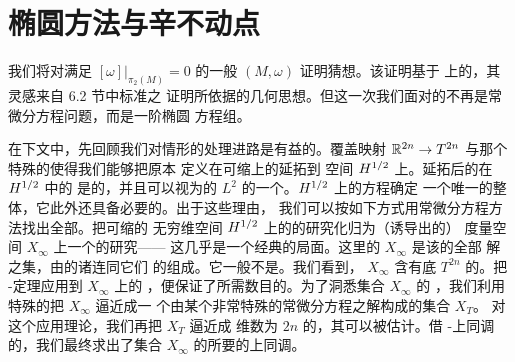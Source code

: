 

\section{椭圆方法与辛不动点}
\label{sec:elliptic-methods}

%
%
%
%
%

我们将对满足 $[\omega]\big|_{\pi_{2}(M)}=0$ 的一般\trCompact%
\trSymplecticManifold{} $(M,\omega)$ 证明\trArnold{}猜想。该证明基于%
\trLoopSpace{}上的\trAction\trFunctional，其灵感来自 6.2 节中标准\trTorus{}之%
证明所依据的几何思想。但这一次我们面对的不再是常微分方程问题，而是一阶椭圆%
方程组。

在下文中，先回顾我们对\trTorus{}情形的处理进路是有益的。覆盖映射%
$\mathbb{R}^{2n}\to T^{2n}$ 与那个特殊的\trSymplecticStructure{}使得我们能够把原本%
定义在\trSmooth{}可缩\trLoop{}上的\trAction\trFunctional{}延拓到%
\trHilbert{}空间 $H^{1/2}$ 上。延拓后的\trFunctional{}在 $H^{1/2}$ 中的%
\trGradient{}是\trSmooth{}的，并且可以视为\trAction{}的 $L^{2}$%
\trGradient{}的一个\trRegularization。$H^{1/2}$ 上的\trGradient{}方程确定%
一个唯一的整体\trFlow，它此外还具备必要的\trCompactness。出于这些理由，%
我们可以按如下方式用常微分方程方法找出全部\trCriticalPoint。把可缩\trLoop{}的%
无穷维空间 $H^{1/2}$ 上的\trGradient\trFlow{}的研究化归为（诱导出的）%
\trCompact{}度量空间 $X_{\infty}$ 上一个\trGradientLike\trFlow{}的研究——%
这几乎是一个经典的局面。这里的 $X_{\infty}$ 是该\trGradient\trFlow{}的全部%
\trBounded{}解之集，由\trAction\trFunctional{}的诸\trCriticalPoint{}连同它们%
的\trConnectingOrbit{}组成。它一般不是\trSmooth\trManifold。我们看到，%
$X_{\infty}$ 含有底\trManifold{} $T^{2n}$ 的\trTopology。把%
\trLjusternik-\trSchnirelman{}定理应用到 $X_{\infty}$ 上的\trGradientLike%
\trFlow，便保证了所需数目的\trRestPoint。为了洞悉集合 $X_{\infty}$ 的%
\trTopology，我们利用特殊的\trSymplecticStructure{}把 $X_{\infty}$ 逼近成一%
个由某个非常特殊的常微分方程\trBoundaryValueProblem{}之解构成的集合 $X_{T}$。%
对这个\trBoundaryValueProblem{}应用\trFredholm{}理论，我们再把 $X_{T}$ 逼近成%
维数为 $2n$ 的\trSmooth\trCompact\trManifold，其\trTopology{}可以被估计。借%
\trAlexander-\trSpanier{}上同调的\trContinuity，我们最终求出了集合%
$X_{\infty}$ 的所要的上同调。

